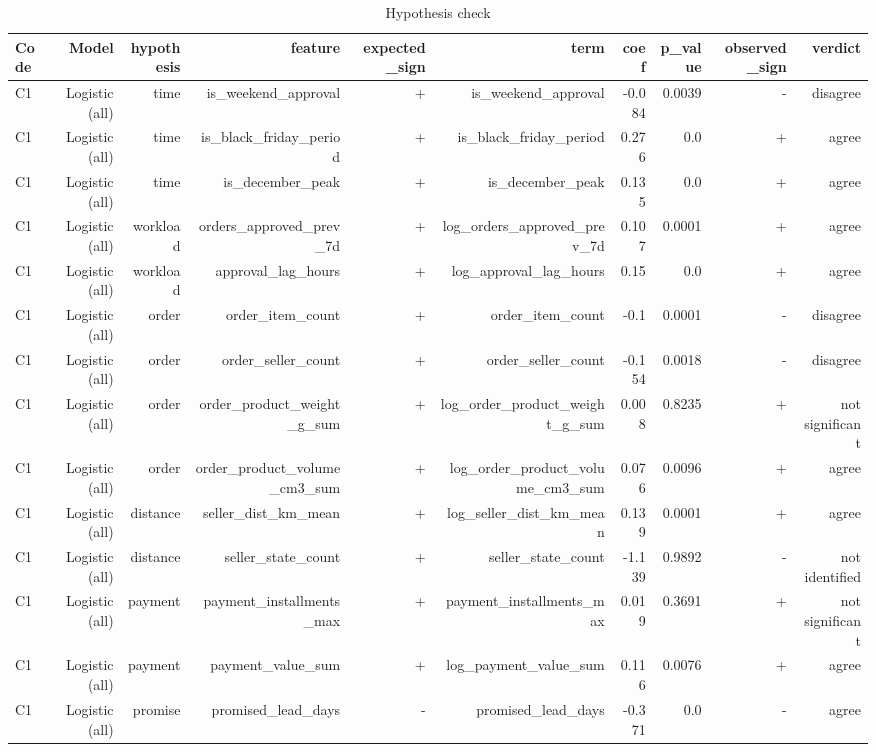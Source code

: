 \begin{table}[htbp]
\centering
\small
\caption{Hypothesis check}
\begin{tabular}{lrrrrrrrrr}
\toprule
Code & Model & hypothesis & feature & expected\_sign & term & coef & p\_value & observed\_sign & verdict \\
\midrule
C1 & Logistic (all) & time & is\_weekend\_approval & + & is\_weekend\_approval & -0.084 & 0.0039 & - & disagree \\
C1 & Logistic (all) & time & is\_black\_friday\_period & + & is\_black\_friday\_period & 0.276 & 0.0 & + & agree \\
C1 & Logistic (all) & time & is\_december\_peak & + & is\_december\_peak & 0.135 & 0.0 & + & agree \\
C1 & Logistic (all) & workload & orders\_approved\_prev\_7d & + & log\_orders\_approved\_prev\_7d & 0.107 & 0.0001 & + & agree \\
C1 & Logistic (all) & workload & approval\_lag\_hours & + & log\_approval\_lag\_hours & 0.15 & 0.0 & + & agree \\
C1 & Logistic (all) & order & order\_item\_count & + & order\_item\_count & -0.1 & 0.0001 & - & disagree \\
C1 & Logistic (all) & order & order\_seller\_count & + & order\_seller\_count & -0.154 & 0.0018 & - & disagree \\
C1 & Logistic (all) & order & order\_product\_weight\_g\_sum & + & log\_order\_product\_weight\_g\_sum & 0.008 & 0.8235 & + & not significant \\
C1 & Logistic (all) & order & order\_product\_volume\_cm3\_sum & + & log\_order\_product\_volume\_cm3\_sum & 0.076 & 0.0096 & + & agree \\
C1 & Logistic (all) & distance & seller\_dist\_km\_mean & + & log\_seller\_dist\_km\_mean & 0.139 & 0.0001 & + & agree \\
C1 & Logistic (all) & distance & seller\_state\_count & + & seller\_state\_count & -1.139 & 0.9892 & - & not identified \\
C1 & Logistic (all) & payment & payment\_installments\_max & + & payment\_installments\_max & 0.019 & 0.3691 & + & not significant \\
C1 & Logistic (all) & payment & payment\_value\_sum & + & log\_payment\_value\_sum & 0.116 & 0.0076 & + & agree \\
C1 & Logistic (all) & promise & promised\_lead\_days & - & promised\_lead\_days & -0.371 & 0.0 & - & agree \\

\end{tabular}
\end{table}
